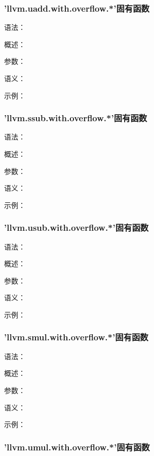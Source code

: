 \documentclass[12pt,a4paper]{article}
\begin{document}
{%

\subsubsection{'llvm.uadd.with.overflow.*'固有函数} %

语法：

概述：

参数：

语义：

示例：


\subsubsection{'llvm.ssub.with.overflow.*'固有函数} %

语法：

概述：

参数：

语义：

示例：


\subsubsection{'llvm.usub.with.overflow.*'固有函数} %

语法：

概述：

参数：

语义：

示例：


\subsubsection{'llvm.smul.with.overflow.*'固有函数} %

语法：

概述：

参数：

语义：

示例：


\subsubsection{'llvm.umul.with.overflow.*'固有函数} %

}
\end{document}
